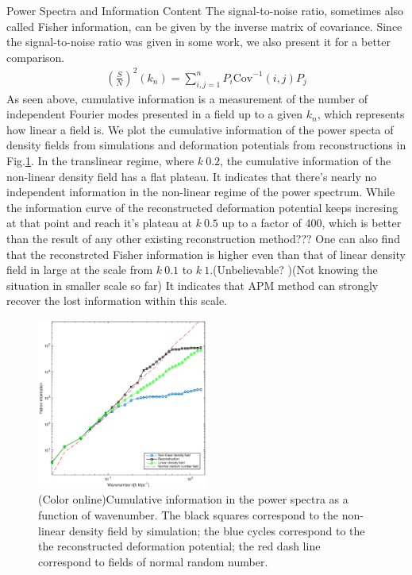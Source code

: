 \begin{section}{Power Spectra and Information Content}
  The signal-to-noise ratio, sometimes also called Fisher information, can be given by the inverse matrix of covariance. Since the signal-to-noise ratio was given in some work, we also present it for a better comparison. 
\begin{align}
\left( \frac{S}{N}\right)^2 (k_{n}) =\sum_{i,j=1}^n P_i \mathrm{Cov}^{-1}(i,j) P_j
\end{align}
As seen above, cumulative information is a measurement of the number of independent Fourier modes presented in a field up to a given $k_n$, which represents how linear a field is. We plot the cumulative information of the power specta of density fields from simulations and deformation potentials from reconstructions in Fig.\ref{fig:fisherinfo}. In the translinear regime, where $k~0.2$, the cumulative information of the non-linear density field has a flat plateau. It indicates that there's nearly no independent information in the non-linear regime of the power spectrum. While the information curve of the reconstructed deformation potential keeps incresing at that point and reach it's plateau at $k~0.5$ up to a factor of 400, which is better than the result of any other existing reconstruction method??? One can also find that the reconstrcted Fisher information is higher even than that of linear density field in large at the scale from $k~0.1$ to $k~1$.(Unbelievable? )(Not knowing the situation in smaller scale so far) It indicates that APM method can strongly recover the lost information within this scale. 
\begin{figure}[htbp]
 \begin{center}
  \includegraphics[width=0.5\textwidth]{fishall.eps}
   \caption{(Color online)Cumulative information in the power spectra as a function of wavenumber. The black squares correspond to the non-linear density field by simulation; the blue cycles correspond to the the reconstructed deformation potential; the red dash line correspond to fields of normal random number.}
  \label{fig:fisherinfo}
 \end{center}
\end{figure}


\end{section}
